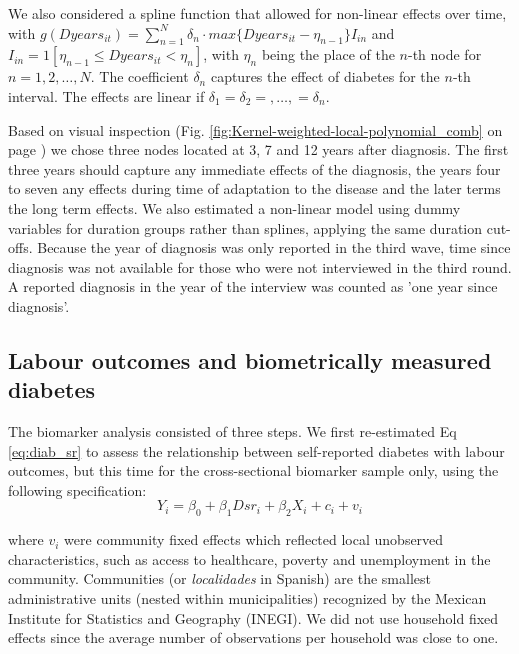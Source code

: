 \documentclass[12pt,english]{article}
\begin{document}
We also considered a spline function that allowed for non-linear effects over time, with $g(Dyears_{it})=\sum_{n=1}^{N}\delta_{n}\cdot max\{Dyears_{it}-\eta_{n-1}\}I_{in}$
and $I_{in}=1[\eta_{n-1}\leq Dyears_{it}<\eta_{n}]$, with $\eta_{n}$ being the place of the $n$-th node for $n=1,2,\ldots,N$. The coefficient $\delta_{n}$ captures the effect of diabetes for the $n$-th interval. The effects are linear if $\delta_{1}=\delta_{2}=,\ldots,=\delta_{n}$.

Based on visual inspection (Fig. \ref{fig:Kernel-weighted-local-polynomial_comb} on page \pageref{fig:Kernel-weighted-local-polynomial_comb}) we chose three nodes located at 3, 7 and 12 years after diagnosis. The first three years should capture any immediate effects of the diagnosis, the years four to seven any effects during time of adaptation to the disease and the later terms the long term effects. We also estimated a non-linear model using dummy variables for duration groups rather than splines, applying the same duration cut-offs. Because the year of diagnosis was only reported in the third wave, time since diagnosis was not available for those who were not interviewed in the third round.  A reported diagnosis in the year of the interview was counted as 'one year since diagnosis'.

\subsection{\label{sec:Biomarker Strategy}Labour outcomes and biometrically measured diabetes}

The biomarker analysis consisted of three steps. We first re-estimated Eq \ref{eq:diab_sr} to assess the relationship between self-reported diabetes with labour outcomes, but this time for the cross-sectional biomarker sample only, using the following specification:
\begin{equation}
Y_{i}=\beta_{0}+\beta_{1}Dsr_{i}+\beta_{2}X_{i}+c_{i}+v_{i}\label{eq:diab_sr}
\end{equation}

where $v_{i}$ were community fixed effects which reflected local unobserved characteristics, such as access to healthcare, poverty and unemployment in the community. Communities (or \textit{localidades} in Spanish) are the smallest administrative units (nested within municipalities) recognized by the Mexican Institute for Statistics and Geography (INEGI). We did not use household fixed effects since the average number of observations per household was close to one.
\end{document}
